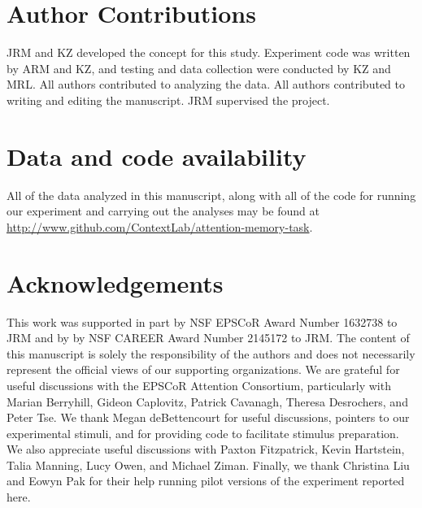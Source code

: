 \documentclass[english]{article}
\begin{document}
\section*{Author Contributions}

JRM and KZ developed the concept for this study. Experiment code was written by
ARM and KZ, and testing and data collection were conducted by KZ and MRL. All
authors contributed to analyzing the data. All authors contributed to writing
and editing the manuscript.  JRM supervised the project.

\section*{Data and code availability}

All of the data analyzed in this manuscript, along with all of the code for
running our experiment and carrying out the analyses may be found at
\url{http://www.github.com/ContextLab/attention-memory-task}.


\section*{Acknowledgements}

This work was supported in part by NSF EPSCoR Award Number 1632738 to JRM and
by by NSF CAREER Award Number 2145172 to JRM. The content of this manuscript is
solely the responsibility of the authors and does not necessarily represent the
official views of our supporting organizations. We are grateful for useful
discussions with the EPSCoR Attention Consortium, particularly with Marian
Berryhill, Gideon Caplovitz, Patrick Cavanagh, Theresa Desrochers, and Peter
Tse. We thank Megan deBettencourt for useful discussions, pointers to our
experimental stimuli, and for providing code to facilitate stimulus
preparation. We also appreciate useful discussions with Paxton Fitzpatrick,
Kevin Hartstein, Talia Manning, Lucy Owen, and Michael Ziman. Finally, we thank
Christina Liu and Eowyn Pak for their help running pilot versions of the
experiment reported here.




\end{document}

